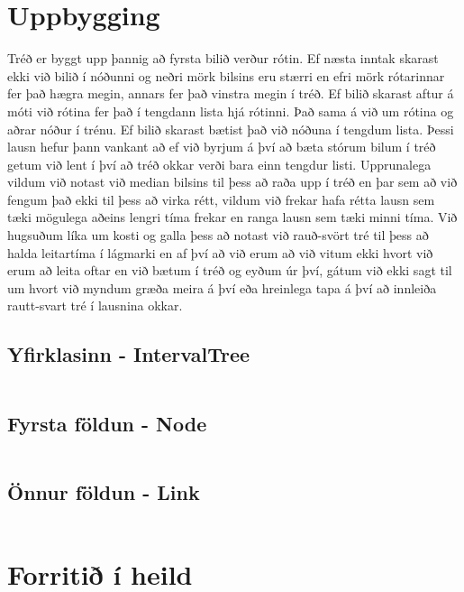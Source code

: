 \documentclass{article}
\begin{document}
\section {Uppbygging}

Tréð er byggt upp þannig að fyrsta bilið verður rótin. Ef næsta inntak skarast ekki við bilið í nóðunni og neðri mörk bilsins eru stærri en efri mörk rótarinnar fer það hægra megin, annars fer það vinstra megin í tréð. Ef bilið skarast aftur á móti við rótina fer það í tengdann lista hjá rótinni. Það sama á við um rótina og aðrar nóður í trénu. Ef bilið skarast bætist það við nóðuna í tengdum lista. Þessi lausn hefur þann vankant að ef við byrjum á því að bæta stórum bilum í tréð getum við lent í því að tréð okkar verði bara einn tengdur listi. Upprunalega vildum við notast við median bilsins til þess að raða upp í tréð en þar sem að við fengum það ekki til þess að virka rétt, vildum við frekar hafa rétta lausn sem tæki mögulega aðeins lengri tíma frekar en ranga lausn sem tæki minni tíma. Við hugsuðum líka um kosti og galla þess að notast við rauð-svört tré til þess að halda leitartíma í lágmarki en af því að við erum að við vitum ekki hvort við erum að leita oftar en við bætum í tréð og eyðum úr því, gátum við ekki sagt til um hvort við myndum græða meira á því eða hreinlega tapa á því að innleiða rautt-svart tré í lausnina okkar.

\subsection{Yfirklasinn - IntervalTree}
\inputminted{java}{Foll.java}

\subsection{Fyrsta földun - Node}
\inputminted{java}{Node.java}

\subsection{Önnur földun - Link}
\inputminted{java}{Link.java}

\pagebreak

\section {Forritið í heild}

\inputminted[mathescape,
               linenos,
               numbersep=10pt,
               gobble=0,
               frame=lines,
               framesep=2mm]{python}{../verk3.py}
\end{document}
